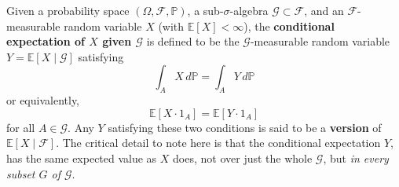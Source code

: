 \documentclass{article}
\begin{document}
    \begin{definition}
      Given a probability space $(\Omega, \mathcal{F}, \mathbb{P})$, a sub-$\sigma$-algebra $\mathcal{G} \subset \mathcal{F}$, and an $\mathcal{F}$-measurable random variable $X$ (with $\mathbb{E}[X] < \infty$), the \textbf{conditional expectation of $X$ given $\mathcal{G}$} is defined to be the $\mathcal{G}$-measurable random variable $Y = \mathbb{E}[X \mid \mathcal{G}]$ satisfying 
      \begin{equation}
        \int_A X \,d\mathbb{P} = \int_A Y \,d \mathbb{P}
      \end{equation}
      or equivalently, 
      \begin{equation}
        \mathbb{E}[X \cdot 1_A] = \mathbb{E}[Y \cdot 1_A]
      \end{equation}
      for all $A \in \mathcal{G}$. Any $Y$ satisfying these two conditions is said to be a \textbf{version} of $\mathbb{E}[X \mid \mathcal{F}]$. The critical detail to note here is that the conditional expectation $Y$, has the same expected value as $X$ does, not over just the whole $\mathcal{G}$, but \textit{in every subset $G$ of $\mathcal{G}$}. 
    \end{definition}
\end{document}
